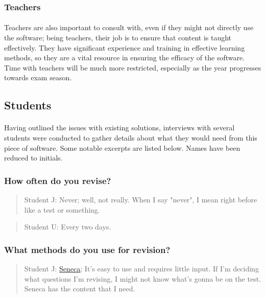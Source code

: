 \documentclass{report}
\begin{document}
\subsubsection{Teachers}
\paragraph{}
Teachers are also important to consult with, even if they might not directly use the software; being teachers, their job is to ensure that content is taught effectively. They have significant experience and training in effective learning methods, so they are a vital resource in ensuring the efficacy of the software. Time with teachers will be much more restricted, especially as the year progresses towards exam season.

\subsection{Students}
\paragraph{}
Having outlined the issues with existing solutions, interviews with several students were conducted to gather details about what they would need from this piece of software. Some notable excerpts are listed below. Names have been reduced to initials.

\hrulefill
\subsubsection{How often do you revise?}
\begin{quote}{Student J:}
  Never; well, not really. When I say "never", I mean right before like a test or something.
\end{quote}

\begin{quote}{Student U:}
  Every two days.
\end{quote}
\subsubsection{What methods do you use for revision?}
\begin{quote}{Student J:}
  \href{https://senecalearning.com/en-GB/}{Seneca}; It's easy to use and requires little input. If I'm deciding what questions I'm revising, I might not know what's gonna be on the test. Seneca has the content that I need.
\end{quote}
\end{document}

